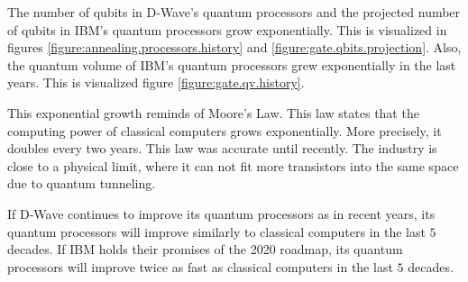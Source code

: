 The number of qubits in D-Wave's quantum processors and the projected number of qubits in IBM's quantum processors grow exponentially.
This is visualized in figures \ref{figure:annealing.processors.history} and \ref{figure:gate.qbits.projection}.
Also, the quantum volume of IBM's quantum processors grew exponentially in the last years.
This is visualized figure \ref{figure:gate.qv.history}.

This exponential growth reminds of Moore's Law.
This law states that the computing power of classical computers grows exponentially.
More precisely, it doubles every two years.
This law was accurate until recently.
The industry is close to a physical limit, where it can not fit more transistors into the same space due to quantum tunneling.
\cite{Theis2017, Ferain2011}

If D-Wave continues to improve its quantum processors as in recent years, its quantum processors will improve similarly to classical computers in the last $5$ decades.
If IBM holds their promises of the 2020 roadmap, its quantum processors will improve twice as fast as classical computers in the last $5$ decades.
